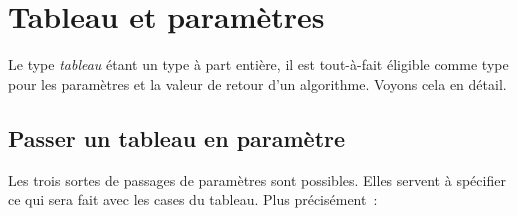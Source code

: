 	\section{Tableau et paramètres}
	
		Le type \emph{tableau} étant un type à part entière,
		il est tout-à-fait éligible comme type
		pour les paramètres et la valeur de retour d’un algorithme.
		Voyons cela en détail.

		\subsection{Passer un tableau en paramètre}
		
			Les trois sortes de passages de paramètres sont possibles.
			Elles servent à spécifier ce qui sera fait avec
			les cases du tableau.
			Plus précisément~:
